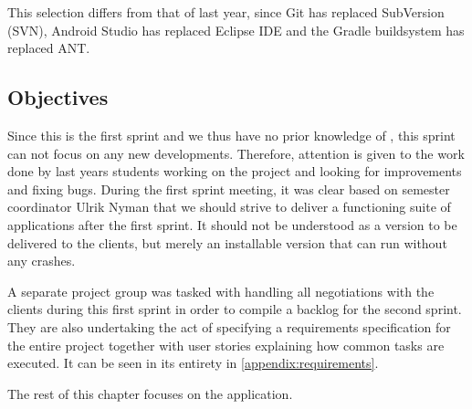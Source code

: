 This selection differs from that of last year, since Git has replaced SubVersion (SVN), Android Studio has replaced Eclipse IDE and the Gradle buildsystem has replaced ANT.

\subsection{Objectives}\label{sec:sprint1:objectives}
Since this is the first sprint and we thus have no prior knowledge of \giraf, this sprint can not focus on any new developments.
Therefore, attention is given to the work done by last years students working on the project and looking for improvements and fixing bugs.
During the first sprint meeting, it was clear based on semester coordinator Ulrik Nyman that we should strive to deliver a functioning suite of applications after the first sprint.
It should not be understood as a version to be delivered to the clients, but merely an installable version that can run without any crashes. 

A separate project group was tasked with handling all negotiations with the clients during this first sprint in order to compile a backlog for the second sprint.
They are also undertaking the act of specifying a requirements specification for the entire project together with user stories explaining how common tasks are executed.
It can be seen in its entirety in \cref{appendix:requirements}.

The rest of this chapter focuses on the \launcher application.